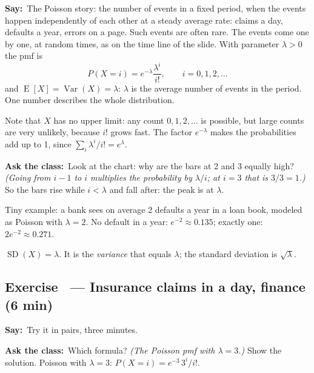 \documentclass[11pt,a4paper,parskip=half]{scrartcl}
\newcommand{\E}{\operatorname{E}}
\newcommand{\Var}{\operatorname{Var}}
\newcommand{\SD}{\operatorname{SD}}
\newcommand{\say}{\textbf{\color{teal}Say:}\ }
\newcommand{\ask}{\textbf{\color{navy}Ask the class:}\ }
\begin{document}
\say The Poisson story: the number of events in a fixed period, when the
events happen independently of each other at a steady average rate:
claims a day, defaults a year, errors on a page. Such events are often
rare. The events come one by one, at random times, as on the time line of
the slide. With parameter $\lambda>0$ the pmf is
\[ P(X=i)=e^{-\lambda}\frac{\lambda^i}{i!},\qquad i=0,1,2,\dots \]
and $\E[X]=\Var(X)=\lambda$: $\lambda$ is the average number of events in
the period. One number describes the whole distribution.

Note that $X$ has no upper limit: any count $0,1,2,\dots$ is possible,
but large counts are very unlikely, because $i!$ grows fast. The factor
$e^{-\lambda}$ makes the probabilities add up to 1, since
$\sum_i\lambda^i/i!=e^\lambda$.

\ask Look at the chart: why are the bars at 2 and 3 equally high?
\emph{(Going from $i-1$ to $i$ multiplies the probability by
$\lambda/i$; at $i=3$ that is $3/3=1$.)} So the bars rise while
$i<\lambda$ and fall after: the peak is at $\lambda$.

Tiny example: a bank sees on average 2 defaults a year in a loan book,
modeled as Poisson with $\lambda=2$. No default in a year:
$e^{-2}\approx0.135$; exactly one: $2e^{-2}\approx0.271$.

\begin{mistake}
	$\SD(X)=\lambda$. It is the \emph{variance} that equals $\lambda$; the
	standard deviation is $\sqrt\lambda$.
\end{mistake}

\needspace{0.25\textheight}
\subsection{Exercise~ --- Insurance claims in a day, finance (6 min)}


\say Try it in pairs, three minutes.

\ask Which formula? \emph{(The Poisson pmf with $\lambda=3$.)} Show the
solution. Poisson with $\lambda=3$: $P(X=i)=e^{-3}\,3^i/i!$.
\end{document}
